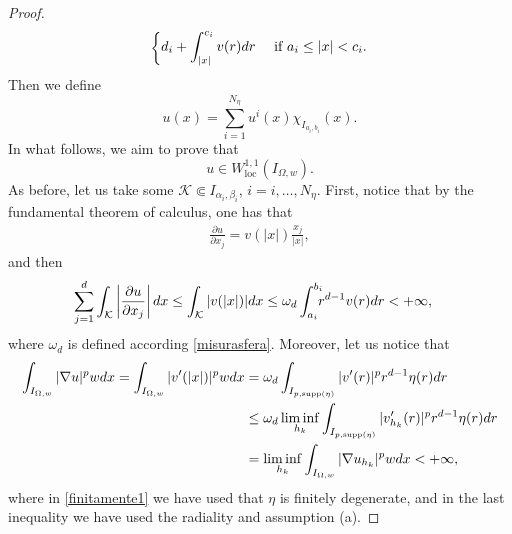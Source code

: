 \documentclass[10pt,a4paper]{amsart}
\def\de{{\rm d}}
\newcommand{\supp}{\mathrm{supp}}
\begin{document}
\begin{proof}
\begin{equation*}
\begin{cases}
\displaystyle d_{i}+\int_{\vert x\vert}^{c_{i}}v(r)\de r&\text{ if } a_{i}\leq \vert x\vert<c_{i}.
\end{cases}
\end{equation*}
Then we define
$$
u(x)=\sum_{i=1}^{N_{\eta}} u^i(x)  \chi_{I_{a_{i},b_{i}}}(x) .
$$
In what follows, we aim to prove that
\begin{equation*}\label{aimed}
u\in W^{1,1}_{\text {loc}}(I_{\Omega, w}).
\end{equation*}
As before, let us take some $\mathcal{K}\Subset I_{\alpha_{i},\beta_{i}}$, $i=i,\ldots, N_{\eta}$. First, notice that by the fundamental theorem of calculus, one has that
\begin{align*}
\frac{\partial u}{\partial x_{j}}=v(\vert x\vert)\frac{x_{j}}{\vert x\vert},
\end{align*}
and then
\begin{align*}
\sum_{j=1}^{d}\displaystyle\int_{\mathcal{K}}\left\vert \frac{\partial u}{\partial x_{j}}\right\vert\de x\leq\displaystyle\int_{\mathcal{K}} \vert v(\vert x \vert)\vert \de x
&\leq \omega_{d}\displaystyle\int_{a_{i}}^{b_{i}}\hskip -0,2cm r^{d-1}v(r)\de r<+\infty,
\end{align*}
where $\omega_{d}$ is defined according \eqref{misurasfera}. Moreover, let us notice that 
\begin{align}\label{finitamente1}
\displaystyle \int_{I_{\Omega,w}}\vert \nabla u\vert^{p}w\de x=\displaystyle \int_{I_{\Omega,w}}\vert v'(\vert x\vert)\vert^{p}w\de x&=\omega_{d}\int_{I_{p,\supp(\eta)}}\vert v'(r)\vert^{p} r^{d-1}\eta(r) \de r\\
&\leq \omega_{d}\liminf_{h_{k}}\displaystyle\int_{I_{p,\supp(\eta)}}\vert v_{h_{k}}'(r)\vert^{p} r^{d-1}\eta(r) \de r\nonumber\\
&=\liminf_{h_{k}}\displaystyle\int_{I_{\Omega,w}}\vert \nabla u_{h_{k}}\vert^{p}w\de x<+\infty,\nonumber
\end{align}
where in \eqref{finitamente1} we have used that $\eta$ is finitely degenerate, and in the last inequality we have used the radiality and assumption (a).
\end{proof}
\end{document}

